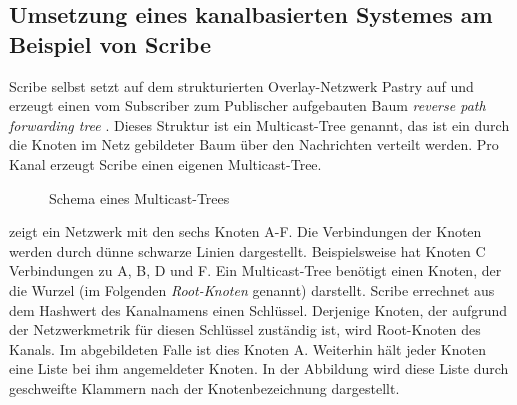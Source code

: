\subsection[Umsetzung eines kanalbasierten Systemes]{Umsetzung eines kanalbasierten Systemes am Beispiel von Scribe}
\label{chap:related:scribe}
Scribe \cite{Castro2002Scribe} selbst setzt auf dem strukturierten Overlay-Netzwerk Pastry \cite{Rowstron2001} auf und erzeugt einen vom Subscriber zum Publischer aufgebauten Baum \emph{reverse path forwarding tree} \cite{Dalal1978}. Dieses Struktur ist ein Multicast-Tree genannt, das ist ein durch die Knoten im Netz gebildeter Baum über den Nachrichten verteilt werden. Pro Kanal erzeugt Scribe einen eigenen Multicast-Tree.


\begin{figure}[htbp]
\centering
{}
\caption{Schema eines Multicast-Trees}
\label{fig:multicast_tree}
\end{figure}

 zeigt ein Netzwerk mit den sechs Knoten A-F. Die Verbindungen der Knoten werden durch dünne schwarze Linien dargestellt. Beispielsweise hat Knoten C Verbindungen zu A, B, D und F. Ein Multicast-Tree benötigt einen Knoten, der die Wurzel (im Folgenden \emph{Root-Knoten} genannt) darstellt. Scribe errechnet aus dem Hashwert des Kanalnamens einen Schlüssel. Derjenige Knoten, der aufgrund der Netzwerkmetrik für diesen Schlüssel zuständig ist, wird Root-Knoten des Kanals. Im abgebildeten Falle ist dies Knoten A. Weiterhin hält jeder Knoten eine Liste bei ihm angemeldeter Knoten. In der Abbildung wird diese Liste durch geschweifte Klammern nach der Knotenbezeichnung dargestellt.

